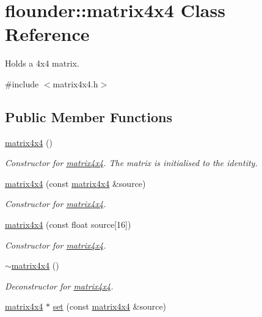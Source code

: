\hypertarget{classflounder_1_1matrix4x4}{}\section{flounder\+:\+:matrix4x4 Class Reference}
\label{classflounder_1_1matrix4x4}


Holds a 4x4 matrix.  




{\ttfamily \#include $<$matrix4x4.\+h$>$}

\subsection*{Public Member Functions}
\begin{DoxyCompactItemize}
\item 
\hyperlink{classflounder_1_1matrix4x4_a3d55e162ebc4f490eeee25e0a63de4c4}{matrix4x4} ()
\begin{DoxyCompactList}\small\item\em Constructor for \hyperlink{classflounder_1_1matrix4x4}{matrix4x4}. The matrix is initialised to the identity. \end{DoxyCompactList}\item 
\hyperlink{classflounder_1_1matrix4x4_aec9982737aef5ba76a18fb37faa51301}{matrix4x4} (const \hyperlink{classflounder_1_1matrix4x4}{matrix4x4} \&source)
\begin{DoxyCompactList}\small\item\em Constructor for \hyperlink{classflounder_1_1matrix4x4}{matrix4x4}. \end{DoxyCompactList}\item 
\hyperlink{classflounder_1_1matrix4x4_a9b162e9c19b5e53f0e8d7cda761fe415}{matrix4x4} (const float source\mbox{[}16\mbox{]})
\begin{DoxyCompactList}\small\item\em Constructor for \hyperlink{classflounder_1_1matrix4x4}{matrix4x4}. \end{DoxyCompactList}\item 
\hyperlink{classflounder_1_1matrix4x4_a0efd92bb3a9177fdd16609cdb122861e}{$\sim$matrix4x4} ()
\begin{DoxyCompactList}\small\item\em Deconstructor for \hyperlink{classflounder_1_1matrix4x4}{matrix4x4}. \end{DoxyCompactList}\item 
\hyperlink{classflounder_1_1matrix4x4}{matrix4x4} $\ast$ \hyperlink{classflounder_1_1matrix4x4_a4faf0d31611a3e1c5c0e80807c6596a3}{set} (const \hyperlink{classflounder_1_1matrix4x4}{matrix4x4} \&source)

\end{DoxyCompactItemize}
